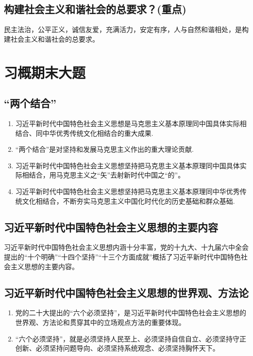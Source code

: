 \documentclass[12pt, a4paper, oneside]{ctexbook}
\begin{document}
\section{构建社会主义和谐社会的总要求？(重点)}

民主法治，公平正义，诚信友爱，充满活力，安定有序，人与自然和谐相处，是构建社会主义和谐社会的总要求。





\chapter{习概期末大题}

\section{“两个结合”}

\begin{enumerate}
\item 习近平新时代中国特色社会主义思想是马克思主义基本原理同中国具体实际相结合、同中华优秀传统文化相结合的重大成果.

\item “两个结合”是对坚持和发展马克思主义作出的重大理论贡献.

\item 习近平新时代中国特色社会主义思想坚持把马克思主义基本原理同中国具体实际相结合，用马克思主义之“矢”去射新时代中国之“的”。

\item 习近平新时代中国特色社会主义思想坚持把马克思主义基本原理同中华优秀传统文化相结合，不断夯实马克思主义中国化时代化的历史基础和群众基础.
\end{enumerate}

\section{习近平新时代中国特色社会主义思想的主要内容}

习近平新时代中国特色社会主义思想内涵十分丰富，党的十九大、十九届六中全会提出的“十个明确”“十四个坚持”“十三个方面成就”概括了习近平新时代中国特色社会主义思想的主要内容。

\section{习近平新时代中国特色社会主义思想的世界观、方法论}

\begin{enumerate}
\item 党的二十大提出的“六个必须坚持”，是习近平新时代中国特色社会主义思想的世界观、方法论和贯穿其中的立场观点方法的重要体现。

\item “六个必须坚持”，就是必须坚持人民至上、必须坚持自信自立、必须坚持守正创新、必须坚持问题导向、必须坚持系统观念、必须坚持胸怀天下。
\end{enumerate}
\end{document}
